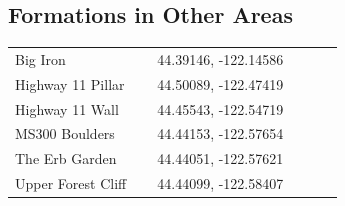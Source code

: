 \begin{flushleft}
\subsection{Formations in Other Areas}
\begin{center}
\begin{supertabular}{p{0.38\linewidth}p{0.5\linewidth}}
Big Iron & 44.39146, -122.14586 \\
Highway 11 Pillar & 44.50089, -122.47419 \\
Highway 11 Wall & 44.45543, -122.54719 \\
MS300 Boulders & 44.44153, -122.57654 \\
The Erb Garden & 44.44051, -122.57621 \\
Upper Forest Cliff & 44.44099, -122.58407 \\
\end{supertabular}
\end{center}

\end{flushleft}
